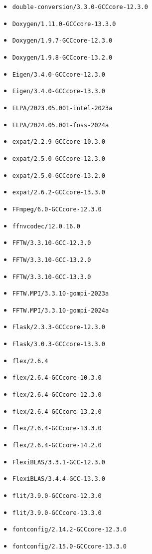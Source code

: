 \begin{multicols}{3}
\begin{itemize}
\item \verb|double-conversion/3.3.0-GCCcore-12.3.0|
\item \verb|Doxygen/1.11.0-GCCcore-13.3.0|
\item \verb|Doxygen/1.9.7-GCCcore-12.3.0|
\item \verb|Doxygen/1.9.8-GCCcore-13.2.0|
\item \verb|Eigen/3.4.0-GCCcore-12.3.0|
\item \verb|Eigen/3.4.0-GCCcore-13.3.0|
\item \verb|ELPA/2023.05.001-intel-2023a|
\item \verb|ELPA/2024.05.001-foss-2024a|
\item \verb|expat/2.2.9-GCCcore-10.3.0|
\item \verb|expat/2.5.0-GCCcore-12.3.0|
\item \verb|expat/2.5.0-GCCcore-13.2.0|
\item \verb|expat/2.6.2-GCCcore-13.3.0|
\item \verb|FFmpeg/6.0-GCCcore-12.3.0|
\item \verb|ffnvcodec/12.0.16.0|
\item \verb|FFTW/3.3.10-GCC-12.3.0|
\item \verb|FFTW/3.3.10-GCC-13.2.0|
\item \verb|FFTW/3.3.10-GCC-13.3.0|
\item \verb|FFTW.MPI/3.3.10-gompi-2023a|
\item \verb|FFTW.MPI/3.3.10-gompi-2024a|
\item \verb|Flask/2.3.3-GCCcore-12.3.0|
\item \verb|Flask/3.0.3-GCCcore-13.3.0|
\item \verb|flex/2.6.4|
\item \verb|flex/2.6.4-GCCcore-10.3.0|
\item \verb|flex/2.6.4-GCCcore-12.3.0|
\item \verb|flex/2.6.4-GCCcore-13.2.0|
\item \verb|flex/2.6.4-GCCcore-13.3.0|
\item \verb|flex/2.6.4-GCCcore-14.2.0|
\item \verb|FlexiBLAS/3.3.1-GCC-12.3.0|
\item \verb|FlexiBLAS/3.4.4-GCC-13.3.0|
\item \verb|flit/3.9.0-GCCcore-12.3.0|
\item \verb|flit/3.9.0-GCCcore-13.3.0|
\item \verb|fontconfig/2.14.2-GCCcore-12.3.0|
\item \verb|fontconfig/2.15.0-GCCcore-13.3.0|

\end{itemize}
\end{multicols}
